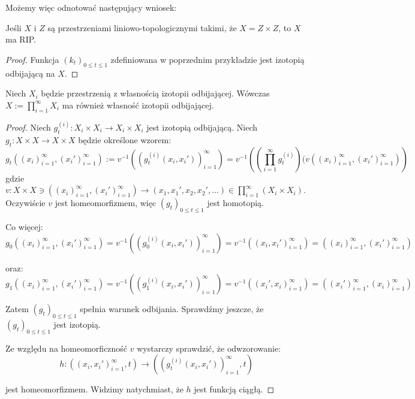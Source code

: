   Możemy więc odnotować następujący wniosek:
\begin{cor} \label{rip-space}
  Jeśli $X$ i $Z$ są przestrzeniami liniowo-topologicznymi takimi, że $X = Z \times Z$, to $X$ ma RIP.
  \begin{proof}
    Funkcja $(k_t)_{0 \leq t \leq 1}$ zdefiniowana w poprzednim przykładzie jest izotopią odbijającą na $X$.
  \end{proof}
\end{cor}


\begin{ex} \label{rip-product}
  Niech $X_i$ będzie przestrzenią z własnością izotopii odbijającej. Wówczas $X := \prod_{i=1}^\infty X_i$ ma również własność izotopii odbijającej.
  \begin{proof}
    Niech $g_t^{(i)}: X_i \times X_i \rightarrow X_i \times X_i$ jest izotopią odbijającą.
    Niech $g_t: X \times X \to X \times X$ będzie określone wzorem:
    \begin{equation*} \label{rip-product-def}
      g_t((x_i)_{i=1}^\infty, (x_i')_{i=1}^\infty) :=
      v^{-1}((g_t^{(i)}(x_i, x_i'))_{i=1}^\infty) =
      v^{-1}\left(\left(\prod_{i=1}^\infty g_t^{(i)}\right)(v((x_i)_{i=1}^\infty, (x_i')_{i=1}^\infty)\right)
    \end{equation*}
    gdzie $v: X \times X \ni ((x_i)_{i=1}^\infty, (x_i')_{i=1}^\infty) \rightarrow (x_1, x_1', x_2, x_2', \ldots) \in \prod_{i=1}^\infty (X_i \times X_i)$. Oczywiście $v$ jest homeomorfizmem, więc $(g_t)_{0 \leq t \leq 1}$ jest homotopią.
    
    Co więcej:
    \[
      g_0((x_i)_{i=1}^\infty, (x_i')_{i=1}^\infty) =
      v^{-1}((g_0^{(i)}(x_i, x_i'))_{i=1}^\infty) =
      v^{-1}((x_i, x_i')_{i=1}^\infty) = ((x_i)_{i=1}^\infty, (x_i')_{i=1}^\infty)
    \]
    
    oraz:
    \[
      g_1((x_i)_{i=1}^\infty, (x_i')_{i=1}^\infty) =
      v^{-1}((g_1^{(i)}(x_i, x_i'))_{i=1}^\infty) =
      v^{-1}((x_i', x_i)_{i=1}^\infty) = ((x_i')_{i=1}^\infty, (x_i)_{i=1}^\infty)
    \]
    
    Zatem $(g_t)_{0 \leq t \leq 1}$ spełnia warunek odbijania. Sprawdźmy jeszcze, że $(g_t)_{0 \leq t \leq 1}$ jest izotopią.
    
    Ze względu na homeomorficzność $v$ wystarczy sprawdzić, że odwzorowanie:
    \[h: ((x_i, x_i')_{i=1}^\infty, t) \rightarrow ((g_t^{(i)}(x_i, x_i'))_{i=1}^\infty, t)\]
    
    jest homeomorfizmem. Widzimy natychmiast, że $h$ jest funkcją ciągłą.
    

\end{proof}
\end{ex}
